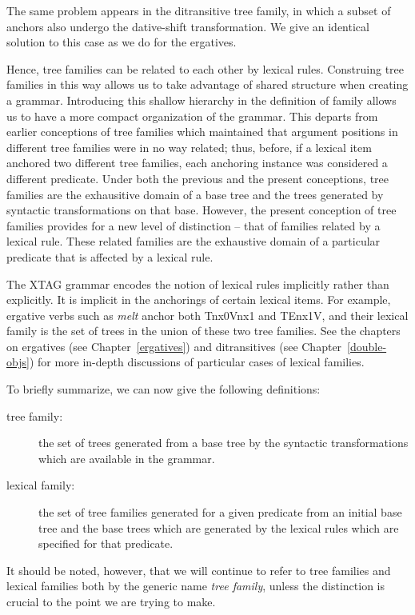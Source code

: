 The same problem appears in the ditransitive tree family, in which a subset of 
anchors also undergo the dative-shift transformation. We give an identical 
solution to this case as we do for the ergatives. 
 
Hence, tree families can be related to each other by lexical rules. 
Construing tree families in this way allows us to take advantage of 
shared structure when creating a grammar. Introducing this shallow 
hierarchy in the definition of family allows us to have a more compact 
organization of the grammar. This departs from earlier conceptions of 
tree families which maintained that argument positions in different 
tree families were in no way related; thus, before, if a lexical item 
anchored two different tree families, each anchoring instance was 
considered a different predicate.  Under both the previous and the 
present conceptions, tree families are the exhausitive domain of a 
base tree and the trees generated by syntactic transformations on that 
base.  However, the present conception of tree families provides for a 
new level of distinction -- that of families related by a lexical 
rule. These related families are the exhaustive domain of a particular 
predicate that is affected by a lexical rule. 
 
The XTAG grammar encodes the notion of lexical rules implicitly rather 
than explicitly. It is implicit in the anchorings of certain lexical 
items.  For example, ergative verbs such as {\it melt} anchor both 
Tnx0Vnx1 and TEnx1V, and their lexical family is the set of trees in 
the union of these two tree families.  See the chapters on ergatives 
(see Chapter~\ref{ergatives}) and ditransitives (see 
Chapter~\ref{double-objs}) for more in-depth discussions of particular 
cases of lexical families. 
 
To briefly summarize, we can now give the following definitions: 
 
\begin{description} 
\item[tree family:] the set of trees generated from a base tree by the 
syntactic transformations which are available in the grammar. 
 
\item[lexical family:] the set of tree families generated for a given 
predicate from an initial base tree and the base trees which are 
generated by the lexical rules which are specified for that predicate. 
 
\end{description} 
 
It should be noted, however, that we will continue to refer to tree families 
and lexical families both by the generic name {\it tree family}, unless the 
distinction is crucial to the point we are trying to make. 
